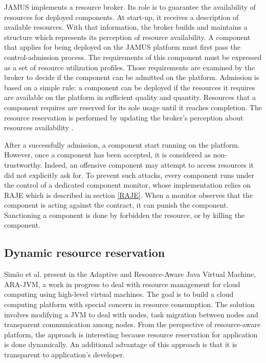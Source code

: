 JAMUS implements a resource broker.
Its role is to guarantee the availability of resources for deployed components.
At start-up, it receives a description of available resources.
With that information, the broker builds and maintains a structure which represents its perception of resource availability.
A component that applies for being deployed on the JAMUS platform must first pass the control-admission process.
The requirements of this component must be expressed as a set of resource utilization profiles.
Those requirements are examined by the broker to decide if the component can be admitted on the platform.
Admission is based on a simple rule: a component can be deployed if the resources it requires are available on the platform in sufficient quality and quantity.
Resources that a component requires are reserved for its sole usage until it reaches completion.
The resource reservation is performed by updating the broker's perception about resources availability \cite{JAMUS2002}.

After a successfully admission, a component start running on the platform.
However, once a component has been accepted, it is considered as non-trustworthy.
Indeed, an offensive component may attempt to access resources it did not explicitly ask for.
To prevent such attacks, every component runs under the control of a dedicated component monitor, whose implementation relies on RAJE which is described in section \ref{RAJE}.
When a monitor observes that the component is acting against the contract, it can punish the component. Sanctioning a component is done by forbidden the resource, or by killing the component.

\subsection{Dynamic resource reservation} \label{CloudReservation}

Sim\~{a}o et al. present in \cite{Simao:2012:VEJ:2310096.2310158} the Adaptive and Resource-Aware Java Virtual Machine, ARA-JVM, a work in progress to deal with resource management for cloud computing using high-level virtual machines.
The goal is to build a cloud computing platform with special concern in resource consumption.
The solution involves modifying a JVM to deal with nodes, task migration between nodes and transparent communication among nodes.
From the perspective of resource-aware platform, the approach is interesting because resource reservation for application is done dynamically.
An additional advantage of this approach is that it is transparent to application's developer.

